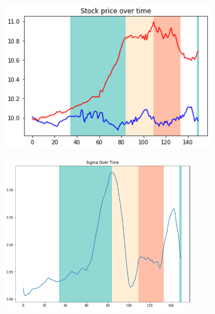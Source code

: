 \documentclass[a4paper, 12pt]{article}
\begin{document}
\begin{figure}[h]
    \centering
    \begin{minipage}{0.5\textwidth}
        \centering
        \includegraphics[width=\textwidth]{price_s3.png}
        \label{fig:my_label3}
    \end{minipage}
    \hfill
    \begin{minipage}{0.45\textwidth}
        \centering
        \includegraphics[width=\textwidth]{sigma_s3.png}
        \label{fig:my_label4}
    \end{minipage}
\end{figure} 

\vspace{\baselineskip}
\end{document}
